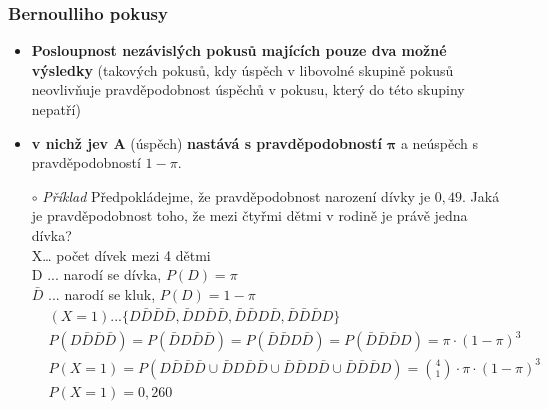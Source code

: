 \subsubsection{Bernoulliho pokusy}
\begin{itemize}
	\item \textbf{Posloupnost nezávislých pokusů majících pouze dva možné výsledky} (takových pokusů, kdy úspěch v libovolné skupině pokusů neovlivňuje pravděpodobnost úspěchů v pokusu, který do této skupiny nepatří)
	\item \textbf{v nichž jev A} (úspěch) \textbf{nastává s pravděpodobností } $\mathbf{\pi}$ a neúspěch s pravděpodobností $1 - \pi$.
	\item[$\circ$] \textit{Příklad} Předpokládejme, že pravděpodobnost narození dívky je $0,49$. Jaká je pravděpodobnost toho, že mezi čtyřmi dětmi v rodině je právě jedna dívka? \\ X… počet dívek mezi 4 dětmi \\ D ... narodí se dívka, $P(D) = \pi$ \\ $\bar{D}$ ...  narodí se kluk, $P(D) = 1 - \pi$
	\begin{equation*}
	\begin{split}
	&(X = 1)... \{D\bar{D}\bar{D}\bar{D},\bar{D}D\bar{D}\bar{D},\bar{D}\bar{D}D\bar{D},\bar{D}\bar{D}\bar{D}D\} \\
&P(D\bar{D}\bar{D}\bar{D}) = P(\bar{D}D\bar{D}\bar{D}) = P(\bar{D}\bar{D}D\bar{D}) = P(\bar{D}\bar{D}\bar{D}D) = \pi \cdot (1 - \pi)^3 \\
&P(X = 1) = P(D\bar{D}\bar{D}\bar{D} \cup \bar{D}D\bar{D}\bar{D} \cup \bar{D}\bar{D}D\bar{D} \cup \bar{D}\bar{D}\bar{D}D) = \binom{4}{1} \cdot \pi \cdot (1 - \pi)^3 \\
&P(X = 1) = 0,260
		\end{split}
		\end{equation*}
\end{itemize}

